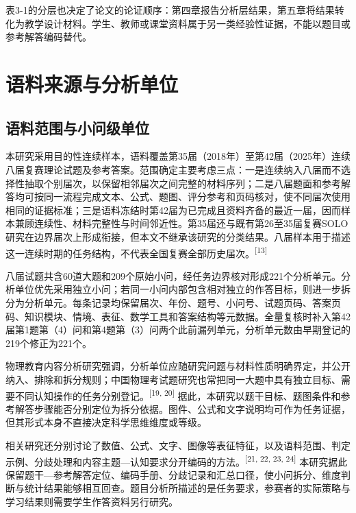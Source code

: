 \documentclass[
  12pt,
  a4paper,twoside,openany]{ctexbook}
\begin{document}
表3-1的分层也决定了论文的论证顺序：第四章报告分析层结果，第五章将结果转化为教学设计材料。学生、教师或课堂资料属于另一类经验性证据，不能以题目或参考解答编码替代。

\section{语料来源与分析单位}\label{ux8bedux6599ux6765ux6e90ux4e0eux5206ux6790ux5355ux4f4d}

\subsection{语料范围与小问级单位}\label{ux8bedux6599ux8303ux56f4ux4e0eux5c0fux95eeux7ea7ux5355ux4f4d}

本研究采用目的性连续样本，语料覆盖第35届（2018年）至第42届（2025年）连续八届复赛理论试题及参考答案。范围确定主要考虑三点：一是连续纳入八届而不选择性抽取个别届次，以保留相邻届次之间完整的材料序列；二是八届题面和参考解答均可按同一流程完成文本、公式、题图、评分参考和页码核对，使不同届次使用相同的证据标准；三是语料冻结时第42届为已完成且资料齐备的最近一届，因而样本兼顾连续性、材料完整性与时间邻近性。第35届还与既有第26至35届复赛SOLO研究在边界届次上形成衔接，但本文不继承该研究的分类结果。八届样本用于描述这一连续时期的任务结构，不代表全国复赛全部历史届次。\textsuperscript{[13]}

八届试题共含60道大题和209个原始小问，经任务边界核对形成221个分析单元。分析单位优先采用独立小问；若同一小问内部包含相对独立的作答目标，则进一步拆分为分析单元。每条记录均保留届次、年份、题号、小问号、试题页码、答案页码、知识模块、情境、表征、数学工具和答案结构等元数据。全量复核时补入第42届第1题第（4）问和第4题第（3）问两个此前漏列单元，分析单元数由早期登记的219个修正为221个。

物理教育内容分析研究强调，分析单位应随研究问题与材料性质明确界定，并公开纳入、排除和拆分规则；中国物理考试题研究也常把同一大题中具有独立目标、需要不同认知操作的任务分别登记。\textsuperscript{[19, 20]}
据此，本研究以题干目标、题图条件和参考解答步骤能否分别定位为拆分依据。图件、公式和文字说明均可作为任务证据，但其形式本身不直接决定科学思维维度或等级。

相关研究还分别讨论了数值、公式、文字、图像等表征特征，以及语料范围、判定示例、分歧处理和内容主题---认知要求分开编码的方法。\textsuperscript{[21, 22, 23, 24]}
本研究据此保留题干---参考解答定位、编码手册、分歧记录和汇总口径，使小问拆分、维度判断与统计结果能够相互回查。题目分析所描述的是任务要求，参赛者的实际策略与学习结果则需要学生作答资料另行研究。
\end{document}
